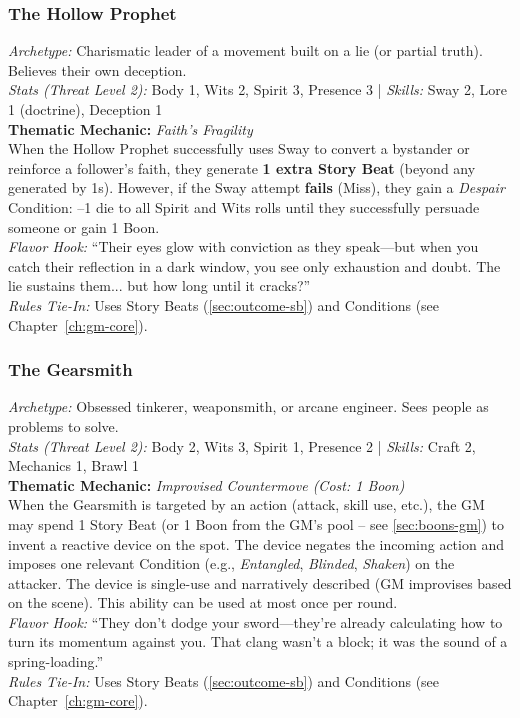 \subsubsection{The Hollow Prophet}
\textit{Archetype:} Charismatic leader of a movement built on a lie (or partial truth). Believes their own deception.\\
\textit{Stats (Threat Level 2):} Body 1, Wits 2, Spirit 3, Presence 3 \quad | \quad \textit{Skills:} Sway 2, Lore 1 (doctrine), Deception 1\\
\textbf{Thematic Mechanic:} \textit{Faith's Fragility} \\
When the Hollow Prophet successfully uses Sway to convert a bystander or reinforce a follower's faith, they generate \textbf{1 extra Story Beat} (beyond any generated by 1s). However, if the Sway attempt \textbf{fails} (Miss), they gain a \textit{Despair} Condition: --1 die to all Spirit and Wits rolls until they successfully persuade someone or gain 1 Boon.\\
\textit{Flavor Hook:} ``Their eyes glow with conviction as they speak---but when you catch their reflection in a dark window, you see only exhaustion and doubt. The lie sustains them... but how long until it cracks?''\\
\textit{Rules Tie-In:} Uses Story Beats (\autoref{sec:outcome-sb}) and Conditions (see Chapter~\ref{ch:gm-core}).

\subsubsection{The Gearsmith}
\textit{Archetype:} Obsessed tinkerer, weaponsmith, or arcane engineer. Sees people as problems to solve.\\
\textit{Stats (Threat Level 2):} Body 2, Wits 3, Spirit 1, Presence 2 \quad | \quad \textit{Skills:} Craft 2, Mechanics 1, Brawl 1\\
\textbf{Thematic Mechanic:} \textit{Improvised Countermove (Cost: 1 Boon)} \\
When the Gearsmith is targeted by an action (attack, skill use, etc.), the GM may spend 1 Story Beat (or 1 Boon from the GM's pool -- see \autoref{sec:boons-gm}) to invent a reactive device on the spot. The device negates the incoming action and imposes one relevant Condition (e.g., \textit{Entangled}, \textit{Blinded}, \textit{Shaken}) on the attacker. The device is single-use and narratively described (GM improvises based on the scene). This ability can be used at most once per round.\\
\textit{Flavor Hook:} ``They don't dodge your sword---they're already calculating how to turn its momentum against you. That clang wasn't a block; it was the sound of a spring-loading.''\\
\textit{Rules Tie-In:} Uses Story Beats (\autoref{sec:outcome-sb}) and Conditions (see Chapter~\ref{ch:gm-core}).

